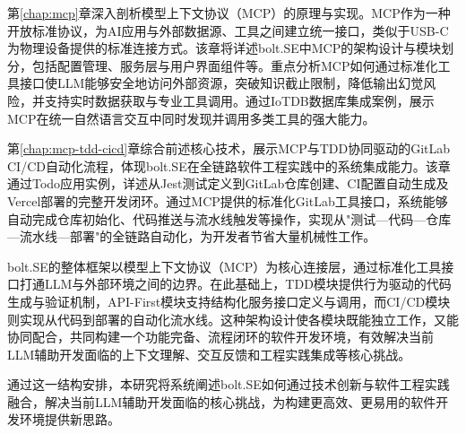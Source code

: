 第\ref{chap:mcp}章深入剖析模型上下文协议（MCP）的原理与实现。MCP作为一种开放标准协议，为AI应用与外部数据源、工具之间建立统一接口，类似于USB-C为物理设备提供的标准连接方式。该章将详述bolt.SE中MCP的架构设计与模块划分，包括配置管理、服务层与用户界面组件等。重点分析MCP如何通过标准化工具接口使LLM能够安全地访问外部资源，突破知识截止限制，降低输出幻觉风险，并支持实时数据获取与专业工具调用。通过IoTDB数据库集成案例，展示MCP在统一自然语言交互中同时发现并调用多类工具的强大能力。

第\ref{chap:mcp-tdd-cicd}章综合前述核心技术，展示MCP与TDD协同驱动的GitLab CI/CD自动化流程，体现bolt.SE在全链路软件工程实践中的系统集成能力。该章通过Todo应用实例，详述从Jest测试定义到GitLab仓库创建、CI配置自动生成及Vercel部署的完整开发闭环。通过MCP提供的标准化GitLab工具接口，系统能够自动完成仓库初始化、代码推送与流水线触发等操作，实现从"测试—代码—仓库—流水线—部署"的全链路自动化，为开发者节省大量机械性工作。

bolt.SE的整体框架以模型上下文协议（MCP）为核心连接层，通过标准化工具接口打通LLM与外部环境之间的边界。在此基础上，TDD模块提供行为驱动的代码生成与验证机制，API-First模块支持结构化服务接口定义与调用，而CI/CD模块则实现从代码到部署的自动化流水线。这种架构设计使各模块既能独立工作，又能协同配合，共同构建一个功能完备、流程闭环的软件开发环境，有效解决当前LLM辅助开发面临的上下文理解、交互反馈和工程实践集成等核心挑战。

通过这一结构安排，本研究将系统阐述bolt.SE如何通过技术创新与软件工程实践融合，解决当前LLM辅助开发面临的核心挑战，为构建更高效、更易用的软件开发环境提供新思路。